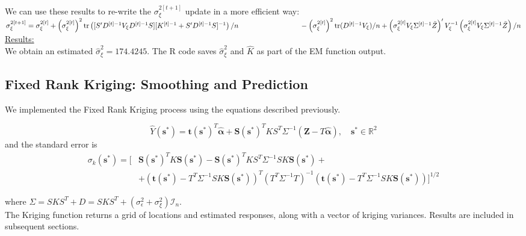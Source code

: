 \documentclass[11pt]{article}
\newcommand{\myindent}{\hspace*{1cm}}
\begin{document}
We can use these results to re-write the $\sigma_\xi^{2[t+1]}$ update in a more efficient way: \\

\myindent \myindent $\sigma_\xi^{2[t+1]} = \sigma_\xi^{2[t]} 
+ \left( \sigma_\xi^{2[t]} \right)^2 \text{tr} \left([S'D^{[t]-1}V_\xi D^{[t]-1}S][K^{[t]-1} + S'D^{[t]-1}S]^{-1} \right)/n \\ \myindent \myindent \myindent
- \left( \sigma_\xi^{2[t]} \right)^2 \text{tr}(D^{[t]-1}V_\xi)/n
+ \left(\sigma_\xi^{2[t]}V_\xi \Sigma^{[t]-1} \tilde{Z}\right)' 
V_\xi^{-1}
\left(\sigma_\xi^{2[t]}V_\xi \Sigma^{[t]-1} \tilde{Z}\right)/n$\\


\underline{Results:}\\
We obtain an estimated $\hat{\sigma}^2_{\xi} = 174.4245$.  The R code saves $\hat{\sigma}^2_{\xi}$ and $\hat{K}$ as part of the EM function output.\\

\subsection{Fixed Rank Kriging: Smoothing and Prediction}

We implemented the Fixed Rank Kriging process using the equations described previously.

\begin{equation}
\hat{Y}(\bm{s}^*) = \bm{t}(\bm{s}^*)^T \hat{\bm{\alpha}} + \bm{S}(\bm{s}^*)^T K S^T \Sigma^{-1} (\bm{Z} - T \hat{\bm{\alpha}}), \quad \bm{s}^* \in \mathbb{R}^2
\end{equation}
and the standard error is
\begin{equation}
\begin{split}
\sigma_k(\bm{s}^*) = \big[ &\bm{S}(\bm{s}^*)^T K \bm{S}(\bm{s}^*) - \bm{S}(\bm{s}^*)^T K S^T \Sigma^{-1} S K \bm{S}(\bm{s}^*) + 
\\
&+ (\bm{t}(\bm{s}^*) - T^T \Sigma^{-1} S K \bm{S}(\bm{s}^*))^T (T^T \Sigma^{-1} T)^{-1} (\bm{t}(\bm{s}^*) - T^T \Sigma^{-1} S K \bm{S}(\bm{s}^*)) \big]^{1/2}
\end{split}
\end{equation}

where $\Sigma = S K S^T + D = S K S^T + (\sigma_\epsilon^2 + \sigma_\xi^2) \mathcal{I}_n$.\\

The Kriging function returns a grid of locations and estimated responses, along with a vector of kriging variances.  Results are included in subsequent sections. \\
\end{document}
